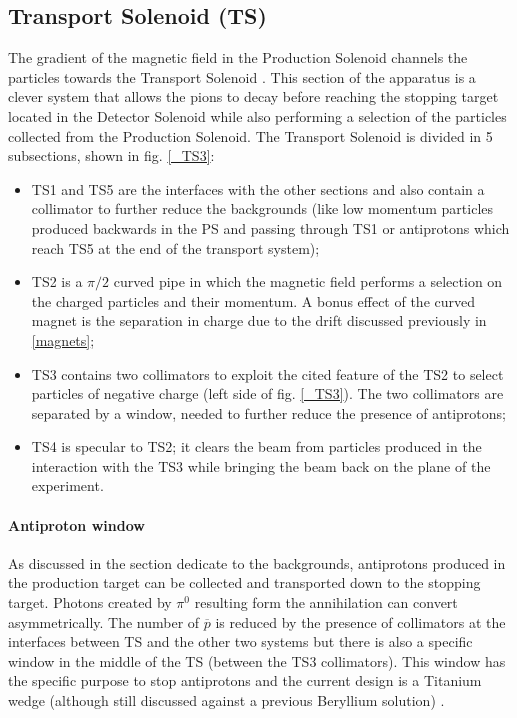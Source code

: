 \documentclass[12pt,a4paper,openright, oneside, titlepage]{book} %
\begin{document}
\subsection{Transport Solenoid (TS)}
The gradient of the magnetic field in the Production Solenoid channels the particles towards the Transport Solenoid \cite{TS}. 
This section of the apparatus is a clever system that allows the pions to decay before reaching the stopping target 
located in the Detector Solenoid
while also performing a selection of the particles collected from the Production Solenoid. 
The Transport Solenoid is divided in 5 subsections, shown in fig. \ref{_TS3}:
\begin{itemize}
\item TS1 and TS5 are the interfaces with the other sections and also contain a collimator to further reduce the backgrounds (like low momentum particles produced backwards in the PS and passing through TS1 or antiprotons which reach TS5 at the end of the transport system);
\item TS2 is a $\pi/2$ curved pipe in which the magnetic field performs a selection on the charged particles and their momentum. A bonus effect of the curved magnet is the separation in charge due to the drift discussed previously in \ref{magnets}; 
\item TS3 contains two collimators to exploit the cited feature of the TS2 to select particles of negative charge (left side of fig. \ref{_TS3}). 
The two collimators are separated by a window, needed to further reduce the presence of antiprotons;
\item TS4 is specular to TS2; it clears the beam from particles produced in the interaction with the TS3 while bringing the beam back on the plane of the experiment.
\end{itemize}

\paragraph{Antiproton window} As discussed in the section dedicate to the backgrounds, antiprotons produced in the production target can be collected and transported down to the stopping target. Photons created by $\pi^0$ resulting form the annihilation can convert asymmetrically. The number of $\overline{p}$ is reduced by the presence of collimators at the interfaces between TS and the other two systems but there is also a specific window in the middle of the TS (between the TS3 collimators). This window has the specific purpose to stop antiprotons and the current design is a Titanium wedge (although still discussed against a previous Beryllium solution) \cite{PbarWindow}.
\end{document}
